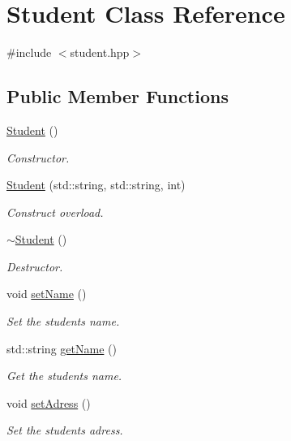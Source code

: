 \hypertarget{classStudent}{}\section{Student Class Reference}
\label{classStudent}


{\ttfamily \#include $<$student.\+hpp$>$}

\subsection*{Public Member Functions}
\begin{DoxyCompactItemize}
\item 
\hyperlink{classStudent_af9168cedbfa5565cf0b20c1a9d3f5c9d}{Student} ()
\begin{DoxyCompactList}\small\item\em Constructor. \end{DoxyCompactList}\item 
\hyperlink{classStudent_ae0f9f843d8276e9cc7736c6b0118a62d}{Student} (std\+::string, std\+::string, int)
\begin{DoxyCompactList}\small\item\em Construct overload. \end{DoxyCompactList}\item 
\hyperlink{classStudent_a54a8ea060d6cd04222c3a2f89829f105}{$\sim$\+Student} ()
\begin{DoxyCompactList}\small\item\em Destructor. \end{DoxyCompactList}\item 
void \hyperlink{classStudent_a5ac76288655c66ad6585540c396bf48e}{set\+Name} ()
\begin{DoxyCompactList}\small\item\em Set the student\textquotesingle{}s name. \end{DoxyCompactList}\item 
std\+::string \hyperlink{classStudent_a729c900a0e95c46f90668f527a72ad34}{get\+Name} ()
\begin{DoxyCompactList}\small\item\em Get the student\textquotesingle{}s name. \end{DoxyCompactList}\item 
void \hyperlink{classStudent_a4c6291d1e293459aa0ca6c6c003a9a8e}{set\+Adress} ()
\begin{DoxyCompactList}\small\item\em Set the student\textquotesingle{}s adress. \end{DoxyCompactList}\item 

\end{DoxyCompactItemize}
